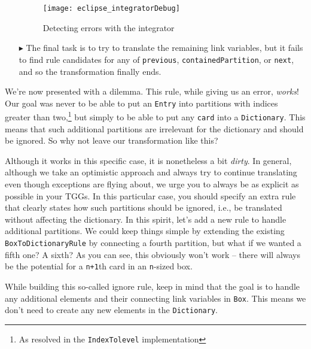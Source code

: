 \begin{itemize}
\begin{figure}[htb]
\begin{center}
  \texttt{[image: eclipse\_integratorDebug]}
  \caption{Detecting errors with the integrator}
  \label{eclipse:integrator_debugSuccess}
\end{center}
\end{figure}

\item[$\blacktriangleright$] The final task is to try to translate the remaining link variables, but it fails to find rule candidates for any of
\texttt{previous}, \texttt{containedPartition}, or \texttt{next}, and so the transformation finally ends.

\end{itemize}

We're now presented with a dilemma. This rule, while giving us an error, \emph{works}! Our goal was never to be able to put an \texttt{Entry} into
partitions with indices greater than two,\footnote{As resolved in the \texttt{IndexTolevel} implementation} but simply to be able to put any \texttt{card} into
a \texttt{Dictionary}. This means that such additional partitions are irrelevant for the dictionary and should be ignored. So why not leave our transformation
like this?

Although it works in this specific case, it is nonetheless a bit \emph{dirty}. In general, although we take an optimistic approach and always try to continue
translating even though exceptions are flying about, we urge you to always be as explicit as possible in your TGGs. In this particular case, you should specify
an extra rule that clearly states how such partitions should be ignored, i.e., be translated without affecting the dictionary. In this spirit, let's add a new
rule to handle additional partitions. We could keep things simple by extending the existing \texttt{BoxToDictionaryRule} by connecting a fourth partition, but
what if we wanted a fifth one? A sixth? As you can see, this obviously won't work -- there will always be the potential for a \texttt{n+1}th card in an \texttt{n}-sized box. 

While building this so-called ignore rule, keep in mind that the goal is to handle any additional elements and their connecting link variables in \texttt{Box}.
This means we don't need to create any new elements in the \texttt{Dictionary}.






